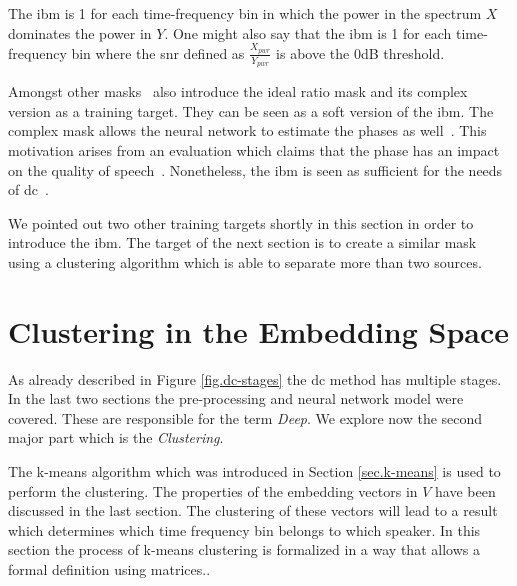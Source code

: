 The \gls{ibm} is 1 for each time-frequency bin in which the power in the spectrum $X$ dominates the power in $Y$. One might also say that the \gls{ibm} is 1 for each time-frequency bin where the \gls{snr} defined as $\frac{X_{pwr}}{Y_{pwr}}$ is above the 0\si{\dB} threshold.

Amongst other masks~\textcite[p.~5]{Wang2018b} also introduce the ideal ratio mask and its complex version as a training target. They can be seen as a soft version of the \gls{ibm}. The complex mask allows the neural network to estimate the phases as well~\cite{Williamson2016}. This motivation arises from an evaluation which claims that the phase has an impact on the quality of speech~\cite{Paliwal2011}. Nonetheless, the \gls{ibm} is seen as sufficient for the needs of \gls{dc}~\cite{Hershey2016}.

We pointed out two other training targets shortly in this section in order to introduce the \gls{ibm}. The target of the next section is to create a similar mask using a clustering algorithm which is able to separate more than two sources.

\section{Clustering in the Embedding Space}\label{sec.clustering}

As already described in Figure \ref{fig.dc-stages} the \acrlong{dc} method has multiple stages. In the last two sections the pre-processing and neural network model were covered. These are responsible for the term \textit{Deep}. We explore now the second major part which is the \textit{Clustering}.

The k-means algorithm which was introduced in Section \ref{sec.k-means} is used to perform the clustering. The properties of the embedding vectors in $V$ have been discussed in the last section. The clustering of these vectors will lead to a result which determines which time frequency bin belongs to which speaker. In this section the process of k-means clustering is formalized in a way that allows a formal definition using matrices..

